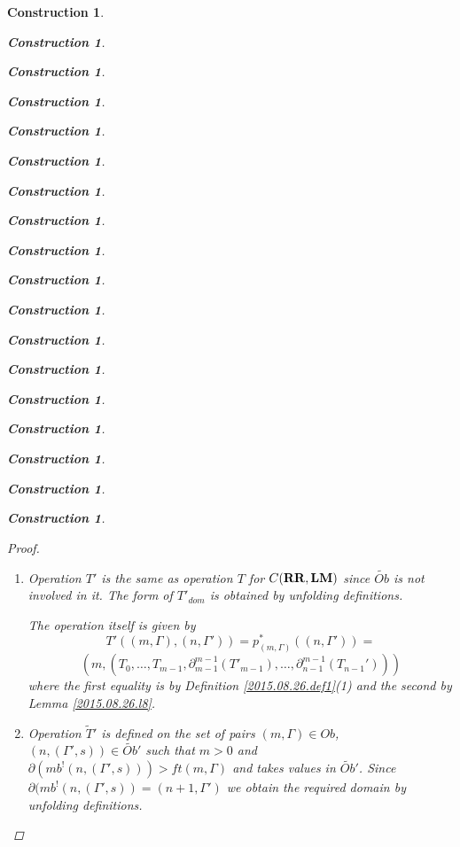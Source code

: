 \documentclass[12pt]{amsart}
\newtheorem{construction}[proposition]{Construction}
\newcommand{\wt}{\widetilde}
\newcommand{\RR}{{\bf RR}}
\newcommand{\LM}{{\bf LM}}
\begin{document}
\begin{construction}
\begin{construction}
\begin{construction}
\begin{construction}
\begin{construction}
\begin{construction}
\begin{construction}
\begin{construction}
\begin{construction}
\begin{construction}
\begin{construction}
\begin{construction}
\begin{construction}
\begin{construction}
\begin{construction}
\begin{construction}
\begin{construction}
\begin{construction}
\begin{proof}
\begin{enumerate}
%
\item Operation $T'$ is the same as operation $T$ for $C(\RR,\LM)$ since $\wt{Ob}$ is not involved in it. The form of $T'_{dom}$ is obtained by unfolding definitions. 

The operation itself is given by 
%
$$T'((m,\Gamma),(n,\Gamma'))=p_{(m,\Gamma)}^*((n,\Gamma'))=$$
$$(m,(T_0,\dots,T_{m-1},\partial_{m-1}^{m-1}(T'_{m-1}),\dots, \partial_{n-1}^{m-1}(T_{n-1}')))$$
%
where the first equality is by Definition \ref{2015.08.26.def1}(1) and the second by Lemma \ref{2015.08.26.l8}. 
%
\item Operation $\wt{T}'$ is defined on the set of pairs $(m,\Gamma)\in Ob$, $(n,(\Gamma',s))\in \wt{Ob}'$ such that $m>0$ and $\partial(mb^!(n,(\Gamma',s)))>ft(m,\Gamma)$ and takes values in $\wt{Ob}'$. Since $\partial(mb^!(n,(\Gamma',s))=(n+1,\Gamma')$ we obtain the required domain by unfolding definitions. 


\end{enumerate}
\end{proof}
\end{construction}
\end{construction}
\end{construction}
\end{construction}
\end{construction}
\end{construction}
\end{construction}
\end{construction}
\end{construction}
\end{construction}
\end{construction}
\end{construction}
\end{construction}
\end{construction}
\end{construction}
\end{construction}
\end{construction}
\end{construction}
\end{document}
